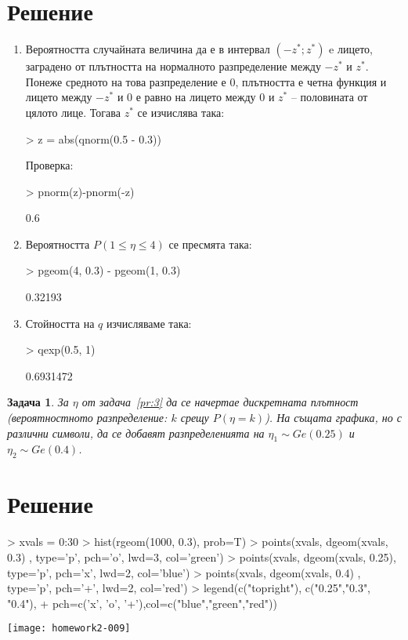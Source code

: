 \documentclass{report}
\newtheorem{pr}{Задача}
\newcommand\sol{\section*{Решение} }
\begin{document}
\sol
\begin{enumerate}[label=(\alph*)]
\item Вероятността случайната величина да е в интервал $(-z^\ast; z^\ast)$ e
  лицето, заградено от плътността на нормалното разпределение между $-z^\ast$ и
  $z^\ast$. Понеже средното на това разпределение е $0$, плътността е четна
  функция и лицето между $-z^\ast$ и $0$ е равно на лицето между $0$ и $z^\ast$
  – половината от цялото лице. Тогава $z^\ast$ се изчислява така:
\begin{Schunk}
\begin{Sinput}
> z = abs(qnorm(0.5 - 0.3))
\end{Sinput}
\end{Schunk}

  Проверка:
\begin{Schunk}
\begin{Sinput}
> pnorm(z)-pnorm(-z)
\end{Sinput}
\begin{Soutput}
[1] 0.6
\end{Soutput}
\end{Schunk}
\item Вероятността $P(1 \leq \eta \leq 4)$ се пресмята така:
\begin{Schunk}
\begin{Sinput}
> pgeom(4, 0.3) - pgeom(1, 0.3)
\end{Sinput}
\begin{Soutput}
[1] 0.32193
\end{Soutput}
\end{Schunk}

\item Стойността на $q$ изчисляваме така:
\begin{Schunk}
\begin{Sinput}
> qexp(0.5, 1)
\end{Sinput}
\begin{Soutput}
[1] 0.6931472
\end{Soutput}
\end{Schunk}
\end{enumerate}

\begin{pr}
  За $\eta$ от задача~\ref{pr:3} да се начертае дискретната плътност
  (вероятностното разпределение: $k$ срещу $P(\eta = k)$). На същата графика, но
  с различни символи, да се добавят разпределенията на $\eta_1 \sim Ge(0.25)$ и
  $\eta_2 \sim Ge(0.4)$.
\end{pr}

\sol

\begin{center}
\begin{Schunk}
\begin{Sinput}
> xvals = 0:30
> hist(rgeom(1000, 0.3), prob=T)
> points(xvals, dgeom(xvals, 0.3) , type='p', pch='o', lwd=3, col='green')
> points(xvals, dgeom(xvals, 0.25), type='p', pch='x', lwd=2, col='blue')
> points(xvals, dgeom(xvals, 0.4) , type='p', pch='+', lwd=2, col='red')
> legend(c("topright"), c("0.25","0.3", "0.4"),
+        pch=c('x', 'o', '+'),col=c("blue","green","red"))
\end{Sinput}
\end{Schunk}
\texttt{[image: homework2-009]}
\end{center}
\end{document}
